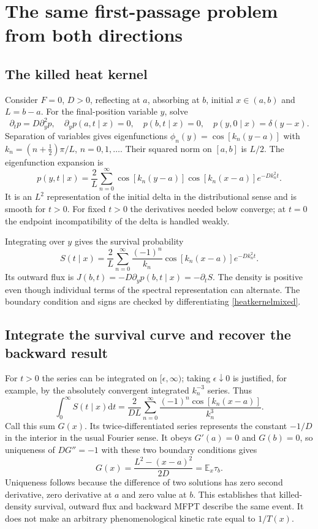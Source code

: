 \documentclass[11pt,a4paper]{article}
\newcommand{\dd}{\mathrm d}
\newcommand{\E}{\mathbb E}
\theoremstyle{remark}\newtheorem*{remark}{Physical interpretation}
\begin{document}
\section{The same first-passage problem from both directions}
\subsection{The killed heat kernel}
Consider $F=0$, $D>0$, reflecting at $a$, absorbing at $b$, initial $x\in(a,b)$ and $L=b-a$. For the final-position variable $y$, solve
\begin{equation}
\partial_t p=D\partial_y^2p,\quad \partial_y p(a,t\mid x)=0,\quad p(b,t\mid x)=0,\quad p(y,0\mid x)=\delta(y-x).
\end{equation}
Separation of variables gives eigenfunctions $\phi_n(y)=\cos[k_n(y-a)]$ with $k_n=(n+\tfrac12)\pi/L$, $n=0,1,\ldots$. Their squared norm on $[a,b]$ is $L/2$. The eigenfunction expansion is
\begin{equation}\label{heatkernelmixed}
p(y,t\mid x)=\frac2L\sum_{n=0}^{\infty}\cos[k_n(y-a)]\cos[k_n(x-a)]e^{-Dk_n^2t}.
\end{equation}
It is an $L^2$ representation of the initial delta in the distributional sense and is smooth for $t>0$. For fixed $t>0$ the derivatives needed below converge; at $t=0$ the endpoint incompatibility of the delta is handled weakly.

Integrating over $y$ gives the survival probability
\begin{equation}\label{mixedsurvival}
S(t\mid x)=\frac2L\sum_{n=0}^{\infty}\frac{(-1)^n}{k_n}\cos[k_n(x-a)]e^{-Dk_n^2t}.
\end{equation}
Its outward flux is $J(b,t)=-D\partial_y p(b,t\mid x)=-\partial_tS$. The density is positive even though individual terms of the spectral representation can alternate. The boundary condition and signs are checked by differentiating \eqref{heatkernelmixed}.

\subsection{Integrate the survival curve and recover the backward result}
For $t>0$ the series can be integrated on $[\epsilon,\infty)$; taking $\epsilon\downarrow0$ is justified, for example, by the absolutely convergent integrated $k_n^{-3}$ series. Thus
\begin{equation}
\int_0^\infty S(t\mid x)\dd t=\frac{2}{DL}\sum_{n=0}^\infty\frac{(-1)^n\cos[k_n(x-a)]}{k_n^3}.
\end{equation}
Call this sum $G(x)$. Its twice-differentiated series represents the constant $-1/D$ in the interior in the usual Fourier sense. It obeys $G'(a)=0$ and $G(b)=0$, so uniqueness of $DG''=-1$ with these two boundary conditions gives
\begin{equation}
G(x)=\frac{L^2-(x-a)^2}{2D}=\E_x\tau_b.
\end{equation}
Uniqueness follows because the difference of two solutions has zero second derivative, zero derivative at $a$ and zero value at $b$. This establishes that killed-density survival, outward flux and backward MFPT describe the same event. It does not make an arbitrary phenomenological kinetic rate equal to $1/T(x)$.
\end{document}
